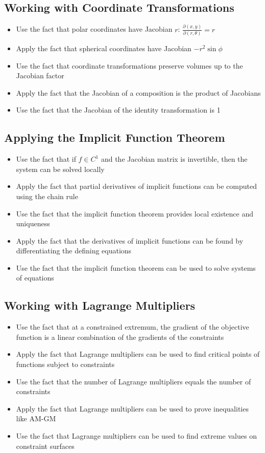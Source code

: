 \subsection*{Working with Coordinate Transformations}
\begin{itemize}
\item Use the fact that polar coordinates have Jacobian $r$: $\frac{\partial(x,y)}{\partial(r,\theta)} = r$
\item Apply the fact that spherical coordinates have Jacobian $-r^2 \sin \phi$
\item Use the fact that coordinate transformations preserve volumes up to the Jacobian factor
\item Apply the fact that the Jacobian of a composition is the product of Jacobians
\item Use the fact that the Jacobian of the identity transformation is 1
\end{itemize}

\subsection*{Applying the Implicit Function Theorem}
\begin{itemize}
\item Use the fact that if $f \in C^1$ and the Jacobian matrix is invertible, then the system can be solved locally
\item Apply the fact that partial derivatives of implicit functions can be computed using the chain rule
\item Use the fact that the implicit function theorem provides local existence and uniqueness
\item Apply the fact that the derivatives of implicit functions can be found by differentiating the defining equations
\item Use the fact that the implicit function theorem can be used to solve systems of equations
\end{itemize}

\subsection*{Working with Lagrange Multipliers}
\begin{itemize}
\item Use the fact that at a constrained extremum, the gradient of the objective function is a linear combination of the gradients of the constraints
\item Apply the fact that Lagrange multipliers can be used to find critical points of functions subject to constraints
\item Use the fact that the number of Lagrange multipliers equals the number of constraints
\item Apply the fact that Lagrange multipliers can be used to prove inequalities like AM-GM
\item Use the fact that Lagrange multipliers can be used to find extreme values on constraint surfaces
\end{itemize}

